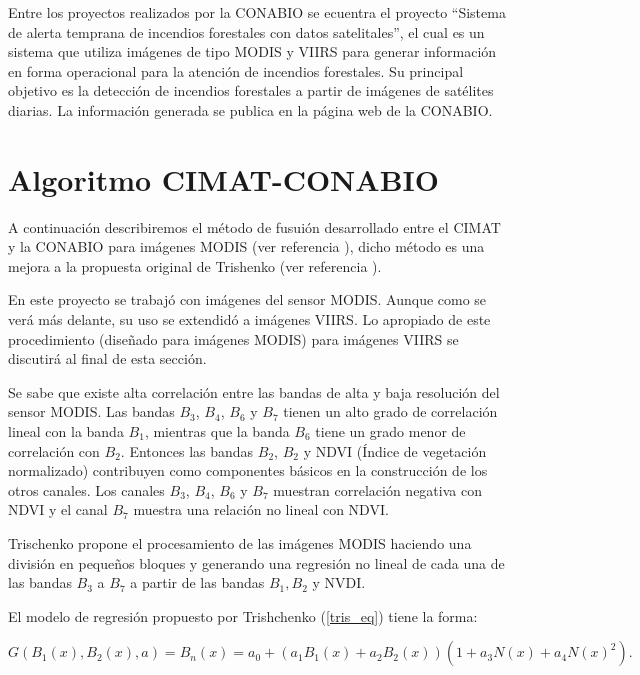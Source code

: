 Entre los proyectos realizados por la CONABIO se ecuentra el proyecto ``Sistema de alerta temprana de incendios forestales con datos satelitales'', el cual es un sistema que utiliza imágenes de tipo MODIS y VIIRS para generar información en forma operacional para la atención de incendios forestales. Su principal objetivo es la detección de incendios forestales a partir de imágenes de satélites diarias. La información generada se publica en la página web de la CONABIO. 

\section{Algoritmo CIMAT-CONABIO}

A continuación describiremos el método de fusuión desarrollado entre el CIMAT y la CONABIO para imágenes MODIS (ver referencia \cite{Judith}), dicho método es una mejora a la propuesta original de Trishenko (ver referencia \cite{Trish}).

En este proyecto se trabajó con imágenes del sensor MODIS. Aunque como se verá más delante, su uso se extendidó a imágenes VIIRS. Lo apropiado de este procedimiento (diseñado para imágenes MODIS) para imágenes VIIRS se discutirá al final de esta sección. 

Se sabe que existe alta correlación entre las bandas de alta y baja resolución del sensor MODIS. Las bandas $B_{3}$, $B_{4}$, $B_{6}$ y $B_{7}$ tienen un alto grado de correlación lineal con la banda $B_{1}$, mientras que la banda $B_{6}$ tiene un grado menor de correlación con $B_{2}$. Entonces las bandas $B_{2}$, $B_{2}$ y NDVI (Índice de vegetación normalizado) contribuyen como componentes básicos en la construcción de los otros canales. Los canales $B_{3}$, $B_{4}$, $B_{6}$ y $B_{7}$ muestran correlación negativa con NDVI y el canal $B_{7}$ muestra una relación no lineal con NDVI.

Trischenko propone el procesamiento de las imágenes MODIS haciendo una división en pequeños bloques y generando una regresión no lineal de cada una de las bandas  $B_{3}$ a $B_{7}$ a partir de las bandas $B_{1}, B_{2}$ y NVDI. 

El modelo de regresión propuesto por Trishchenko (\ref{tris_eq}) tiene la forma: 

\begin{equation}\label{tris_eq}
G(B_{1}(x), B_{2}(x),a) = B_{n}(x) = a_{0} + (a_{1}B_{1}(x) + a_{2}B_{2}(x))(1 + a_{3}N(x) + a_{4}N(x)^{2}).
\end{equation}

